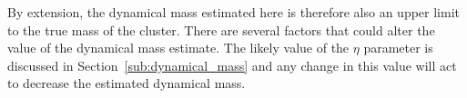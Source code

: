 \documentclass[useAMS,usenatbib]{mn2e}
\def\kms{$\mbox{km s}^{-1}$}
\begin{document}
By extension, the dynamical mass estimated here is therefore also an upper limit to the true mass of the cluster.
There are several factors that could alter the value of the dynamical mass estimate.
The likely value of the $\eta$ parameter is discussed in Section~\ref{sub:dynamical_mass} and any change in this value will act to decrease the estimated dynamical mass.







\end{document}
